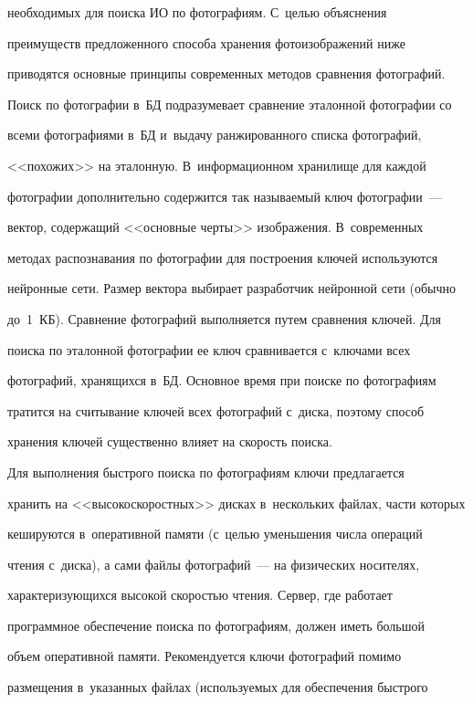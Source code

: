 необходимых для поиска ИО по фотографиям. С~целью объяснения 


преимуществ предложенного способа хранения фотоизображений ниже 


приводятся основные принципы современных методов сравнения фотографий. 


Поиск по фотографии в~БД подразумевает сравнение эталонной фотографии со 


всеми фотографиями в~БД и~выдачу ранжированного списка фотографий, 


<<похожих>> на эталонную. В~информационном хранилище для каждой 


фотографии дополнительно содержится так называемый ключ фотографии~--- 


вектор, содержащий <<основные черты>> изображения. В~современных 


методах распознавания по фотографии для построения ключей используются 


нейронные сети. Размер вектора выбирает разработчик нейронной сети (обычно  


до~1~КБ). Сравнение фотографий выполняется путем сравнения ключей. Для 


поиска по эталонной фотографии ее ключ сравнивается с~ключами всех 


фотографий, хранящихся в~БД. Основное время при поиске по фотографиям 


тратится на считывание ключей всех фотографий с~диска, поэтому способ 


хранения ключей существенно влияет на скорость поиска.


      


      Для выполнения быстрого поиска по фотографиям ключи предлагается 


хранить на <<высокоскоростных>> дисках в~нескольких файлах, части которых 


кешируются в~оперативной памяти (с~целью уменьшения числа операций 


чтения с~диска), а сами файлы фотографий~--- на физических носителях, 


характеризующихся высокой скоростью чтения. Сервер, где работает 


программное обеспечение поиска по фотографиям, должен иметь большой 


объем оперативной памяти. Рекомендуется ключи фотографий помимо 


размещения в~указанных файлах (используемых для обеспечения быстрого 


